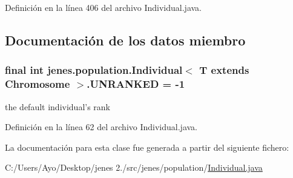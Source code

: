 Definición en la línea 406 del archivo Individual.\-java.



\subsection{Documentación de los datos miembro}
\hypertarget{classjenes_1_1population_1_1_individual_3_01_t_01extends_01_chromosome_01_4_a6f913202241aa5f7255e482179175f62}{
\subsubsection[{U\-N\-R\-A\-N\-K\-E\-D}]{\setlength{\rightskip}{0pt plus 5cm}final int jenes.\-population.\-Individual$<$ T extends Chromosome $>$.U\-N\-R\-A\-N\-K\-E\-D = -\/1\hspace{0.3cm}{\ttfamily [static]}}}\label{classjenes_1_1population_1_1_individual_3_01_t_01extends_01_chromosome_01_4_a6f913202241aa5f7255e482179175f62}
the default individual's rank 

Definición en la línea 62 del archivo Individual.\-java.



La documentación para esta clase fue generada a partir del siguiente fichero\-:\begin{DoxyCompactItemize}
\item 
C\-:/\-Users/\-Ayo/\-Desktop/jenes 2./src/jenes/population/\hyperlink{_individual_8java}{Individual.\-java}\end{DoxyCompactItemize}
